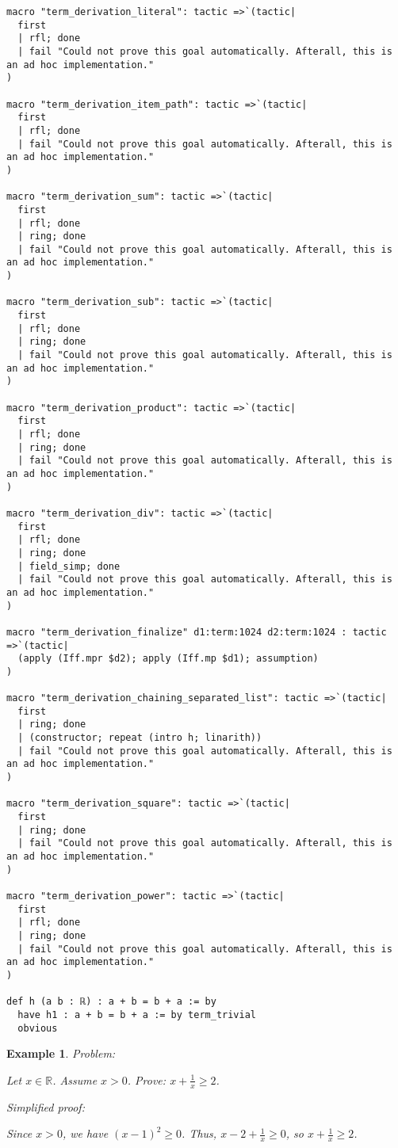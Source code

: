 \documentclass{article}
\newtheorem{example}{Example}
\begin{document}
\begin{tcolorbox}[colback=white!10, width=\linewidth]
\begin{lstlisting}[language=Lean4]
macro "term_derivation_literal": tactic =>`(tactic|
  first
  | rfl; done
  | fail "Could not prove this goal automatically. Afterall, this is an ad hoc implementation."
)

macro "term_derivation_item_path": tactic =>`(tactic|
  first
  | rfl; done
  | fail "Could not prove this goal automatically. Afterall, this is an ad hoc implementation."
)

macro "term_derivation_sum": tactic =>`(tactic|
  first
  | rfl; done
  | ring; done
  | fail "Could not prove this goal automatically. Afterall, this is an ad hoc implementation."
)

macro "term_derivation_sub": tactic =>`(tactic|
  first
  | rfl; done
  | ring; done
  | fail "Could not prove this goal automatically. Afterall, this is an ad hoc implementation."
)

macro "term_derivation_product": tactic =>`(tactic|
  first
  | rfl; done
  | ring; done
  | fail "Could not prove this goal automatically. Afterall, this is an ad hoc implementation."
)

macro "term_derivation_div": tactic =>`(tactic|
  first
  | rfl; done
  | ring; done
  | field_simp; done
  | fail "Could not prove this goal automatically. Afterall, this is an ad hoc implementation."
)

macro "term_derivation_finalize" d1:term:1024 d2:term:1024 : tactic =>`(tactic|
  (apply (Iff.mpr $d2); apply (Iff.mp $d1); assumption)
)

macro "term_derivation_chaining_separated_list": tactic =>`(tactic|
  first
  | ring; done
  | (constructor; repeat (intro h; linarith))
  | fail "Could not prove this goal automatically. Afterall, this is an ad hoc implementation."
)

macro "term_derivation_square": tactic =>`(tactic|
  first
  | ring; done
  | fail "Could not prove this goal automatically. Afterall, this is an ad hoc implementation."
)

macro "term_derivation_power": tactic =>`(tactic|
  first
  | rfl; done
  | ring; done
  | fail "Could not prove this goal automatically. Afterall, this is an ad hoc implementation."
)

def h (a b : ℝ) : a + b = b + a := by
  have h1 : a + b = b + a := by term_trivial
  obvious

\end{lstlisting}
\end{tcolorbox}


\begin{example}
Problem:
\begin{tcolorbox}[colback=yellow!10, width=\linewidth]
Let $x\in\mathbb{R}$. Assume $x> 0$. Prove: $x + \frac{1}{x} \ge 2$.
\end{tcolorbox}

Simplified proof:
\begin{tcolorbox}[colback=blue!10, width=\linewidth]
Since $x>0$, we have $(x-1)^2 \ge 0$. Thus, $x - 2 + \frac{1}{x} \ge 0$, so $x + \frac{1}{x} \ge 2$.
\end{tcolorbox}
\end{example}
\end{document}
